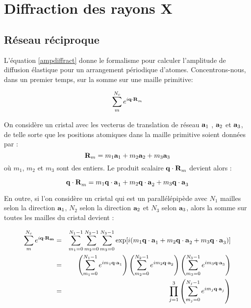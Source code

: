 \section{Diffraction des rayons X}

\subsection{Réseau réciproque}

L'équation \ref{ampdiffract} donne le formalisme pour calculer l'amplitude de
diffusion élastique pour un arrangement périodique d'atomes. Concentrons-nous,
dans un premier temps, sur la somme sur une maille primitive:

\begin{equation}
    \sum_m^{N_c} e^{i\mathbf{q\cdot R}_m}
\end{equation}

On considère un cristal avec les vecterus de translation de réseau $\mathbf{a}_1$
, $\mathbf{a}_2$ et $\mathbf{a}_3$, de telle sorte que les positions atomiques
dans la maille primitive soient données par :
\begin{equation}
    \mathbf{R}_m = m_1 \mathbf{a}_1 + m_2 \mathbf{a}_2 + m_3 \mathbf{a}_3
\end{equation}
où $m_1$, $m_2$ et $m_3$ sont des entiers. Le produit scalaire
$\mathbf{q\cdot R}_m$ devient alors :

\begin{equation}
    \mathbf{q\cdot R}_m = m_1 \mathbf{q \cdot a}_1 + m_2 \mathbf{q \cdot a}_2 + m_3 \mathbf{q \cdot a}_3
\end{equation}

En outre, si l'on considère un cristal qui est un parallélépipède avec $N_1$
mailles selon la direction $\mathbf{a}_1$, $N_2$ selon la direction $\mathbf{a}_2$
et $N_3$ selon $\mathbf{a}_3$, alors la somme sur toutes les mailles du cristal
devient :

\begin{eqnarray}
    \sum_m^{N_c} e^{i \mathbf{q\cdot R_m}} & = &
        \sum_{m_1 = 0}^{N_1 - 1} \sum_{m_2 = 0}^{N_2 - 1} \sum_{m_3 = 0}^{N_3 - 1}
        \exp [i(m_1 \mathbf{q \cdot a}_1 + m_2 \mathbf{q \cdot a}_2 + m_3 \mathbf{q \cdot a}_3)]\\
        & = & \left( \sum_{m_1 = 0}^{N_1 - 1} e^{i m_1 \mathbf{q\cdot a}_1} \right)
        \left( \sum_{m_2 = 0}^{N_2-1} e^{i m_2 \mathbf{q\cdot a}_2} \right)
        \left( \sum_{m_3 = 0}^{N_3-1} e^{i m_3 \mathbf{q\cdot a}_3} \right)\\
        & = & \prod_{j=1}^3 \left( \sum_{m_j = 0}^{N_j -1} e^{i m_j \mathbf{q\cdot a}_j} \right)
    \end{eqnarray}


